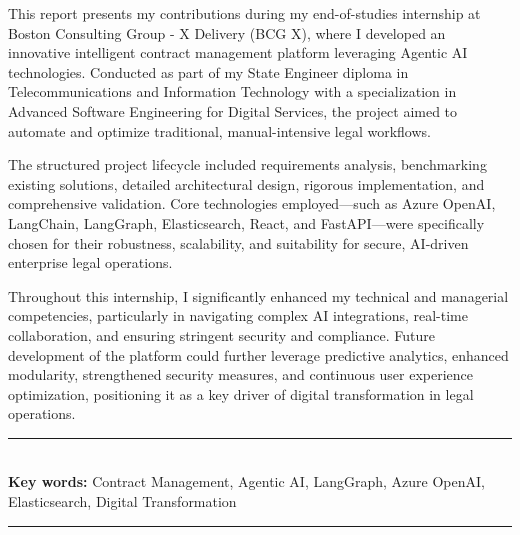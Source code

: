 This report presents my contributions during my end-of-studies internship at Boston Consulting Group - X Delivery (BCG X), where I developed an innovative intelligent contract management platform leveraging Agentic AI technologies. Conducted as part of my State Engineer diploma in Telecommunications and Information Technology with a specialization in Advanced Software Engineering for Digital Services, the project aimed to automate and optimize traditional, manual-intensive legal workflows.\mynewline

The structured project lifecycle included requirements analysis, benchmarking existing solutions, detailed architectural design, rigorous implementation, and comprehensive validation. Core technologies employed—such as Azure OpenAI, LangChain, LangGraph, Elasticsearch, React, and FastAPI—were specifically chosen for their robustness, scalability, and suitability for secure, AI-driven enterprise legal operations.\mynewline

Throughout this internship, I significantly enhanced my technical and managerial competencies, particularly in navigating complex AI integrations, real-time collaboration, and ensuring stringent security and compliance. Future development of the platform could further leverage predictive analytics, enhanced modularity, strengthened security measures, and continuous user experience optimization, positioning it as a key driver of digital transformation in legal operations.

\bigskip

\noindent\rule{\textwidth}{0.3mm} \\[0.4cm]
\textbf{Key words:}
Contract Management, Agentic AI, LangGraph, Azure OpenAI, Elasticsearch, Digital Transformation
\\[0.1cm]
\noindent\rule{\textwidth}{0.3mm} \\[0.4cm]